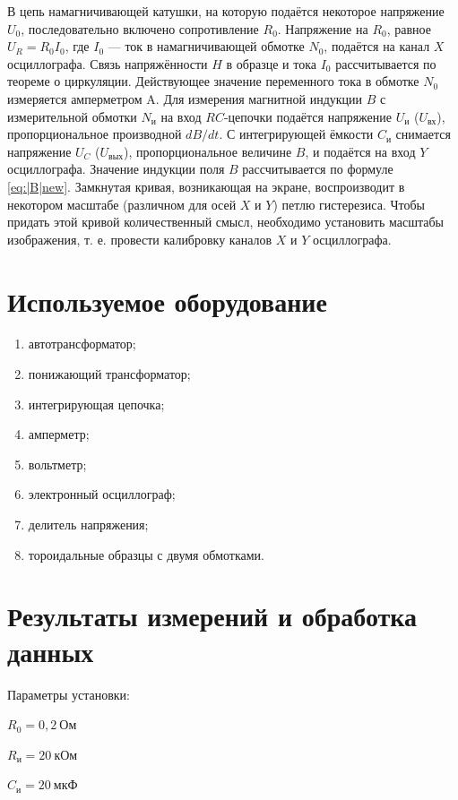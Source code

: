 \documentclass[a4paper, 12pt]{article}
\begin{document}
В цепь намагничивающей катушки, на которую подаётся некоторое
напряжение $U_0$, последовательно включено сопротивление $R_0$. Напряжение на $R_0$, равное $U_R = R_0I_0$, где $I_0$ — ток в намагничивающей обмотке $N_0$, подаётся на канал $ X $ осциллографа. Связь напряжённости $ H $ в
образце и тока $I_0$ рассчитывается по теореме о циркуляции. 
Действующее значение переменного тока в обмотке $N_0$ измеряется амперметром A.
Для измерения магнитной индукции $ B $ с измерительной обмотки $N_\text{и}$
на вход $ RC $-цепочки подаётся напряжение $U_\text{и}$ ($U_{\text{вх}}$), пропорциональное
производной $ dB/dt $. С интегрирующей ёмкости $C_\text{и}$ снимается напряжение $U_C$ ($U_{\text{вых}}$), пропорциональное величине $ B $, и подаётся на вход $ Y $
осциллографа. Значение индукции поля $ B $ рассчитывается по формуле \eqref{eq:|B|new}.
Замкнутая кривая, возникающая на экране, воспроизводит в некотором масштабе (различном для осей $ X $ и $ Y $) петлю гистерезиса. Чтобы придать этой кривой количественный смысл, необходимо установить
масштабы изображения, т. е. провести калибровку каналов $ X $ и $ Y $ осциллографа.
  	
\section{Используемое оборудование}

\begin{enumerate}
    \item автотрансформатор;
    \item понижающий трансформатор;
    \item интегрирующая цепочка;
    \item амперметр;
    \item вольтметр;
    \item электронный осциллограф;
    \item делитель напряжения;
    \item тороидальные образцы с двумя обмотками.
\end{enumerate}

\section{Результаты измерений и обработка данных}

Параметры установки:
\begin{description}
\item{} $R_0 = 0,2~Ом$
\item{} $R_и = 20~кОм$
\item{} $C_и = 20~мкФ$
\end{description}
\end{document}

